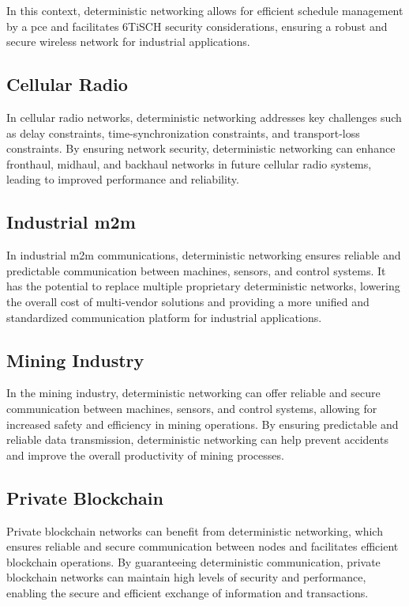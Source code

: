 \documentclass[runningheads]{llncs}
\begin{document}
In this context, deterministic networking allows for efficient schedule management by a \gls{pce} and facilitates 6TiSCH security considerations, ensuring a robust and secure wireless network for industrial applications.

\subsection{Cellular Radio}
In cellular radio networks, deterministic networking addresses key challenges such as delay constraints, time-synchronization constraints, and transport-loss constraints. By ensuring network security, deterministic networking can enhance fronthaul, midhaul, and backhaul networks in future cellular radio systems, leading to improved performance and reliability.

\subsection{Industrial \gls{m2m}}
In industrial \gls{m2m} communications, deterministic networking ensures reliable and predictable communication between machines, sensors, and control systems. It has the potential to replace multiple proprietary deterministic networks, lowering the overall cost of multi-vendor solutions and providing a more unified and standardized communication platform for industrial applications.

\subsection{Mining Industry}
In the mining industry, deterministic networking can offer reliable and secure communication between machines, sensors, and control systems, allowing for increased safety and efficiency in mining operations. By ensuring predictable and reliable data transmission, deterministic networking can help prevent accidents and improve the overall productivity of mining processes.

\subsection{Private Blockchain}
Private blockchain networks can benefit from deterministic networking, which ensures reliable and secure communication between nodes and facilitates efficient blockchain operations. By guaranteeing deterministic communication, private blockchain networks can maintain high levels of security and performance, enabling the secure and efficient exchange of information and transactions.
\end{document}
